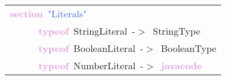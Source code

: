 \begin{tabular}[t]{l}
\noindent
\mbox{}\textbf{\textcolor{Plum}{section}}\ \textcolor{RoyalBlue}{"{}Literals"{}} \\
\mbox{}\ \ \ \ \ \ \textbf{\textcolor{Plum}{typeof}}\ StringLiteral\ -$>$\ StringType \\
\mbox{}\ \ \ \ \ \ \textbf{\textcolor{Plum}{typeof}}\ BooleanLiteral\ -$>$\ BooleanType \\
\mbox{}\ \ \ \ \ \ \textbf{\textcolor{Plum}{typeof}}\ NumberLiteral\ -$>$\ \textbf{\textcolor{Plum}{javacode}}
\end{tabular}
